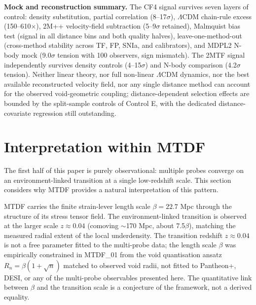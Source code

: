 \documentclass[11pt,a4paper]{article}
\begin{document}
\begin{mdframed}[linecolor=accent,linewidth=0.5pt,backgroundcolor=callout-bg,leftline=true,rightline=true,topline=true,bottomline=true,innerleftmargin=8pt,innerrightmargin=8pt,innertopmargin=6pt,innerbottommargin=6pt]
\textbf{Mock and reconstruction summary.} The CF4 signal survives seven layers of control: density substitution, partial correlation (8--17\(\sigma\)), \(\Lambda\)CDM chain-rule excess (150--610$\times$), 2M++ velocity-field subtraction (5--9\(\sigma\) retained), Malmquist bias test (signal in all distance bins and both quality halves), leave-one-method-out (cross-method stability across TF, FP, SNIa, and calibrators), and MDPL2 N-body mock (9.0\(\sigma\) tension with 100 observers, sign mismatch). The 2MTF signal independently survives density controls (4--15\(\sigma\)) and N-body comparison (4.2\(\sigma\) tension). Neither linear theory, nor full non-linear \(\Lambda\)CDM dynamics, nor the best available reconstructed velocity field, nor any single distance method can account for the observed void-geometric coupling; distance-dependent selection effects are bounded by the split-sample controls of Control E, with the dedicated distance-covariate regression still outstanding.
\end{mdframed}

\section{Interpretation within MTDF}
\label{sec:sec8}
The first half of this paper is purely observational: multiple probes converge on an environment-linked transition at a single low-redshift scale. This section considers why MTDF provides a natural interpretation of this pattern.

MTDF carries the finite strain-lever length scale \(\beta = 22.7\) Mpc through the structure of its stress tensor field. The environment-linked transition is observed at the larger scale \(z \approx 0.04\) (comoving \(\sim\)170 Mpc, about 7.5\(\beta\)), matching the measured radial extent of the local underdensity. The transition redshift \(z \approx 0.04\) is not a free parameter fitted to the multi-probe data; the length scale \(\beta\) was empirically constrained in MTDF\_\allowbreak{}01 from the void quantisation ansatz \(R_n = \beta(1+\sqrt{n})\) matched to observed void radii, not fitted to Pantheon+, DESI, or any of the multi-probe observables presented here. The quantitative link between \(\beta\) and the transition scale is a conjecture of the framework, not a derived equality.
\end{document}
